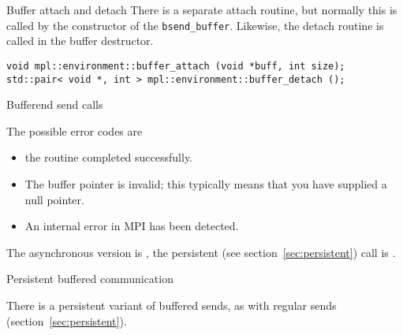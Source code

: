 \begin{mplnote}{Buffer attach and detach}
  There is a separate attach routine, but normally this is called
  by the constructor of the \lstinline+bsend_buffer+.
  Likewise, the detach routine is called in the buffer destructor.
\begin{lstlisting}
void mpl::environment::buffer_attach (void *buff, int size);
std::pair< void *, int > mpl::environment::buffer_detach ();
\end{lstlisting}
\end{mplnote}

 {Bufferend send calls}

The possible error codes are
\begin{itemize}
\item {} the routine completed successfully.
\item {} The buffer pointer is invalid;
  this typically means that you have supplied a null pointer.
\item {} An internal error in MPI has been detected.
\end{itemize}

The asynchronous version is , the persistent
(see section~\ref{sec:persistent}) call is .

 {Persistent buffered communication}

There is a persistent variant 
of buffered sends, as with regular
sends (section~\ref{sec:persistent}).

